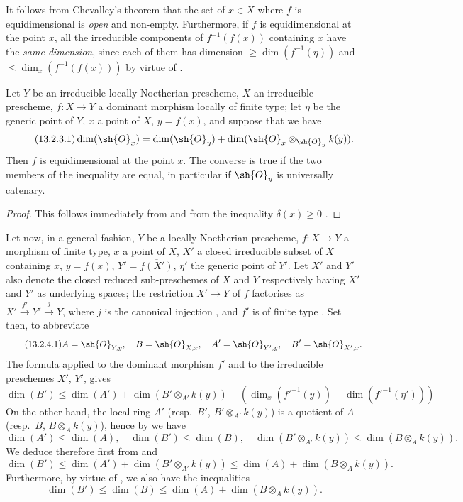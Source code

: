 It follows from Chevalley's theorem  that the set of $x\in X$ where $f$ is equidimensional is \emph{open} and non-empty.
Furthermore, if $f$ is equidimensional at the point $x$, all the irreducible components of $f^{-1}(f(x))$ containing $x$ have the \emph{same dimension}, since each of them has dimension $\geq\dim(f^{-1}(\eta))$  and $\leq\dim_x(f^{-1}(f(x)))$ by virtue of .

\begin{proposition}[13.2.3]
\label{IV.13.2.3}
Let $Y$ be an irreducible locally Noetherian prescheme, $X$ an irreducible prescheme, $f:X\to Y$ a dominant morphism locally of finite type; let $\eta$ be the generic point of $Y$, $x$ a point of $X$, $y=f(x)$, and suppose that we have
\[
\tag{13.2.3.1}
  \dim(\sh{O}_x)=\dim(\sh{O}_y)+\dim(\sh{O}_x\otimes_{\sh{O}_y}k(y)).
\]
Then $f$ is equidimensional at the point $x$.
The converse is true if the two members of the inequality  are equal, in particular if $\sh{O}_y$ is universally catenary.
\end{proposition}

\begin{proof}
This follows immediately from  and from the inequality $\delta(x)\geq 0$ .
\end{proof}

\begin{env}[13.2.4]
\label{IV.13.2.4}
Let now, in a general fashion, $Y$ be a locally Noetherian prescheme, $f:X\to Y$ a morphism of finite type, $x$ a point of $X$, $X'$ a closed irreducible subset of $X$ containing $x$, $y=f(x)$, $Y'=\overline{f(X')}$, $\eta'$ the generic point of $Y'$.
Let $X'$ and $Y'$ also denote the closed reduced sub-preschemes of $X$ and $Y$ respectively having $X'$ and $Y'$ as underlying spaces; the restriction $X'\to Y$ of $f$ factorises as $X'\xrightarrow{f'}Y'\xrightarrow{j}Y$, where $j$ is the canonical injection , and $f'$ is of finite type .
Set then, to abbreviate
\[
\tag{13.2.4.1}
  A=\sh{O}_{Y,y},\quad B=\sh{O}_{X,x},\quad A'=\sh{O}_{Y',y},\quad B'=\sh{O}_{X',x}.
\]
The formula  applied to the dominant morphism $f'$ and to the irreducible preschemes $X'$, $Y'$, gives
\[
\tag{13.2.4.2}
  \dim(B')\leq\dim(A')+\dim(B'\otimes_{A'}k(y))-(\dim_x(f'^{-1}(y))-\dim(f'^{-1}(\eta')))
\]
On the other hand, the local ring $A'$ (resp.\ $B'$, $B'\otimes_{A'}k(y)$) is a quotient of $A$ (resp.\ $B$, $B\otimes_A k(y)$), hence by  we have
\[
\tag{13.2.4.3}
  \dim(A')\leq\dim(A),\quad \dim(B')\leq\dim(B),\quad \dim(B'\otimes_{A'}k(y))\leq\dim(B\otimes_A k(y)).
\]
We deduce therefore first from  and 
\[
\tag{13.2.4.4}
  \dim(B')\leq\dim(A')+\dim(B'\otimes_{A'}k(y))\leq\dim(A)+\dim(B\otimes_A k(y)).
\]
Furthermore, by virtue of , we also have the inequalities
\[
\tag{13.2.4.5}
  \dim(B')\leq\dim(B)\leq\dim(A)+\dim(B\otimes_A k(y)).
\]
\end{env}

